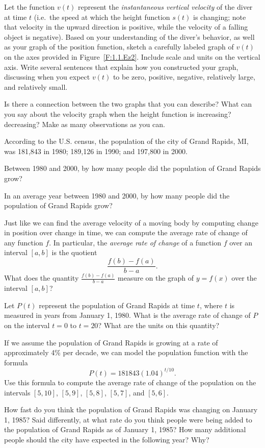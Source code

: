 \begin{exercises}
  \item Let the function $v(t)$ represent the \emph{instantaneous vertical velocity} of the diver at time $t$ (i.e.~the speed at which the height function $s(t)$ is changing; note that velocity in the upward direction is positive, while the velocity of a falling object is negative).  Based on your understanding of the diver's behavior, as well as your graph of the position function, sketch a carefully labeled graph of $v(t)$ on the axes provided  in Figure~\ref{F:1.1.Ez2}.  Include scale and units on the vertical axis.  Write several sentences that explain how you constructed your graph, discussing when you expect $v(t)$ to be zero, positive, negative, relatively large, and relatively small.
  \item Is there a connection between the two graphs that you can describe?  What can you say about the velocity graph when the height function is increasing?  decreasing?  Make as many observations as you can.
\ea
\begin{exerciseSolution}
\end{exerciseSolution}

\item According to the U.S. census, the population of the city of Grand Rapids, MI, was 181,843 in 1980; 189,126 in 1990; and 197,800 in 2000.

\ba
	\item Between 1980 and 2000, by how many people did the population of Grand Rapids grow?
	\item In an average year between 1980 and 2000, by how many people did the population of Grand Rapids grow?
	\item Just like we can find the average velocity of a moving body by computing change in position over change in time, we can compute the average rate of change of any function $f$.  In particular, the \emph{average rate of change} of a function $f$ over an interval $[a,b]$ is the quotient
$$\frac{f(b)-f(a)}{b-a}.$$  
What does the quantity $\frac{f(b)-f(a)}{b-a}$ measure on the graph of $y = f(x)$ over the interval $[a,b]$?
	\item Let $P(t)$ represent the population of Grand Rapids at time $t$, where $t$ is measured in years from January 1, 1980.  What is the average rate of change of $P$ on the interval $t = 0$ to $t = 20$?  What are the units on this quantity?
	\item If we assume the population of Grand Rapids is growing at a rate of approximately 4\% per decade,  we can model the population function with the formula $$P(t) = 181843 (1.04)^{t/10}.$$  Use this formula to compute the average rate of change of the population on the intervals $[5,10]$, $[5,9]$, $[5,8]$, $[5,7]$, and $[5,6]$.
	\item How fast do you think the population of Grand Rapids was changing on January 1, 1985?  Said differently, at what rate do you think people were being added to the population of Grand Rapids as of January 1, 1985?  How many additional people should the city have expected in the following year?  Why?
\ea

\end{exercises}
\afterexercises
